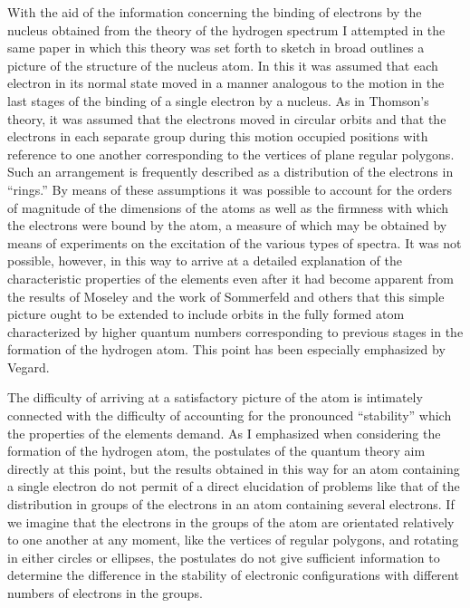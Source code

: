 With the aid of the information concerning the binding of
electrons by the nucleus obtained from the theory of the hydrogen
spectrum I attempted in the same paper in which this theory was
set forth to sketch in broad outlines a picture of the structure of
the nucleus atom. In this it was assumed that each electron in its
normal state moved in a manner analogous to the motion in
the last stages of the binding of a single electron by a nucleus.
As in Thomson's theory, it was assumed that the electrons moved
in circular orbits and that the electrons in each separate group
during this motion occupied positions with reference to one another
corresponding to the vertices of plane regular polygons. Such an
arrangement is frequently described as a distribution of the electrons
in ``rings.'' By means of these assumptions it was possible to
account for the orders of magnitude of the dimensions of the atoms
as well as the firmness with which the electrons were bound by the
atom, a measure of which may be obtained by means of experiments
on the excitation of the various types of spectra. It was not
possible, however, in this way to arrive at a detailed explanation
of the characteristic properties of the elements even after it had
become apparent from the results of Moseley and the work of
Sommerfeld and others that this simple picture ought to be extended
to include orbits in the fully formed atom characterized by
higher quantum numbers corresponding to previous stages in the
formation of the hydrogen atom. This point has been especially
emphasized by Vegard.

The difficulty of arriving at a satisfactory picture of the atom is
intimately connected with the difficulty of accounting for the pronounced
``stability'' which the properties of the elements demand.
As I emphasized when considering the formation of the hydrogen
atom, the postulates of the quantum theory aim directly at this
point, but the results obtained in this way for an atom containing
a single electron do not permit of a direct elucidation of problems
like that of the distribution in groups of the electrons in an atom
containing several electrons. If we imagine that the electrons in
the groups of the atom are orientated relatively to one another at any
moment, like the vertices of regular polygons, and rotating in either
circles or ellipses, the postulates do not give sufficient information to
determine the difference in the stability of electronic configurations
with different numbers of electrons in the groups.

